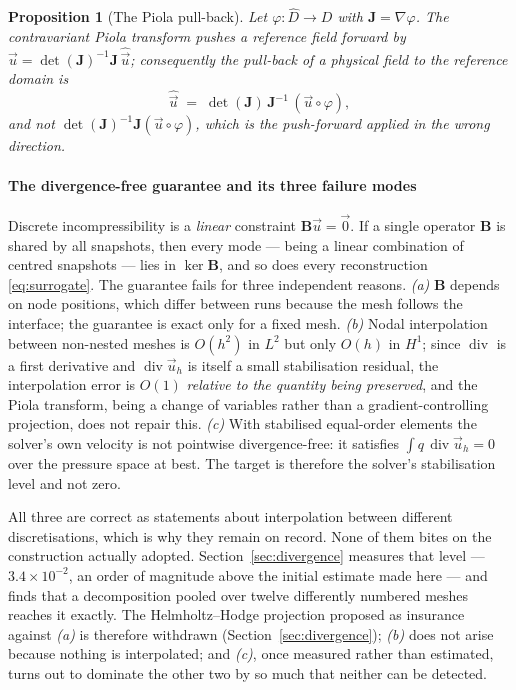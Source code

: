\documentclass[11pt,a4paper]{article}
\newcommand{\vect}[1]{\mathbf{#1}}
\DeclareMathOperator{\dive}{div}
\theoremstyle{plain}
\newtheorem{proposition}{Proposition}
\theoremstyle{definition}
\theoremstyle{remark}
\begin{document}
\begin{proposition}[The Piola pull-back]
\label{prop:piola}
Let $\varphi:\hat{D}\to D$ with $\vect{J} = \nabla\varphi$. The contravariant
Piola transform pushes a reference field forward by
$\vec{u} = \det(\vect{J})^{-1}\vect{J}\,\hat{\vec{u}}$; consequently the
pull-back of a physical field to the reference domain is
\begin{equation}
\label{eq:piola}
\hat{\vec{u}} \;=\; \det(\vect{J})\,\vect{J}^{-1}\,(\vec{u}\circ\varphi),
\end{equation}
and not $\det(\vect{J})^{-1}\vect{J}(\vec{u}\circ\varphi)$, which is the
push-forward applied in the wrong direction.
\end{proposition}

\label{rem:div}
\paragraph{The divergence-free guarantee and its three failure modes}
Discrete incompressibility is a \emph{linear} constraint
$\vect{B}\vec{u} = \vec{0}$. If a single operator $\vect{B}$ is shared by all
snapshots, then every mode --- being a linear combination of centred snapshots
--- lies in $\ker\vect{B}$, and so does every reconstruction
\eqref{eq:surrogate}. The guarantee fails for three independent reasons.
\emph{(a)} $\vect{B}$ depends on node positions, which differ between runs
because the mesh follows the interface; the guarantee is exact only for a fixed
mesh. \emph{(b)} Nodal interpolation between non-nested meshes is $O(h^2)$ in
$L^2$ but only $O(h)$ in $H^1$; since $\dive$ is a first derivative and
$\dive\vec{u}_h$ is itself a small stabilisation residual, the interpolation
error is $O(1)$ \emph{relative to the quantity being preserved}, and the Piola
transform, being a change of variables rather than a gradient-controlling
projection, does not repair this. \emph{(c)} With stabilised equal-order
elements the solver's own velocity is not pointwise divergence-free: it satisfies
$\int q\,\dive\vec{u}_h = 0$ over the pressure space at best. The target is
therefore the solver's stabilisation level and not zero.

All three are correct as statements about interpolation between different
discretisations, which is why they remain on record. None of them bites on the
construction actually adopted. Section~\ref{sec:divergence} measures that level
--- $3.4\times10^{-2}$, an order of magnitude above the initial estimate made
here --- and finds that a decomposition pooled over twelve differently numbered
meshes reaches it exactly. The Helmholtz--Hodge projection proposed as insurance
against \emph{(a)} is therefore withdrawn
(Section~\ref{sec:divergence}); \emph{(b)} does not arise because nothing is
interpolated; and \emph{(c)}, once measured rather than estimated, turns out to
dominate the other two by so much that neither can be detected.
\end{document}
